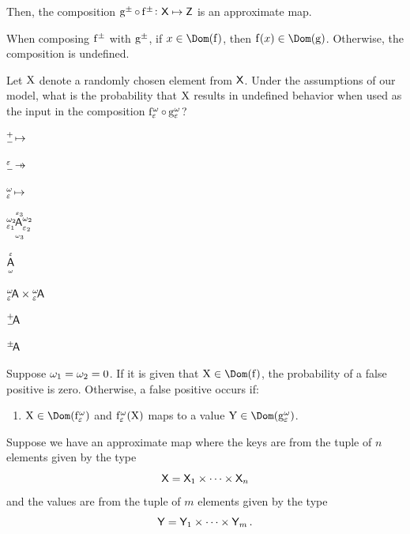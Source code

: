 \documentclass[11pt,final,hidelinks]{article}
\begin{document}
Then, the composition $\APFun{g} \circ \APFun{f} \colon \Set{X} \mapsto \Set{Z}$ is an approximate map.

\begin{assumption}
When composing $\APFun{f}$ with $\APFun{g}$, if $x \in \Dom(\Fun{f})$, then $\Fun{f}(x) \in \Dom\!\left(\Fun{g}\right)$. Otherwise, the composition is undefined.
\end{assumption}
Let $\mathrm{X}$ denote a randomly chosen element from $\Set{X}$. Under the assumptions of our model, what is the probability that $\mathrm{X}$ results in undefined behavior when used as the input in the composition $\APFun{f}[\fprate][\fnrate] \circ \APFun{g}[\fprate][\fnrate]$?


$\ATL{\mapsto}$

$\ATL{\pfun}[\fprate]$

$\ATL{\mapsto}[\fprate][\fnrate]$


$\ATOverUnder{\AT{\ATL{\Set{A}}[\fprate_1][\fnrate_2]}[\fprate_2][\fnrate_2]}[\fprate_3][\fnrate_3]$

$\ATOverUnder{\Set{A}}[\fprate][\fnrate]$


$\ATL{\Set{A}}[\fprate][\fnrate] \times \ATL{\Set{A}}[\fprate][\fnrate]$


$\ATL{\Set{A}}$

${}^{\pm} \! \Set{A}$



Suppose $\omega_1 = \omega_2 = 0$. If it is given that $\RV{X} \in \Dom(\Fun{f})$, the probability of a false positive is zero. Otherwise, a false positive occurs if:
\begin{enumerate}
    \item $\RV{X} \in \Dom(\APFun{f}[\fprate][\fnrate])$ and $\APFun{f}[\fprate][\fnrate](\RV{X})$ maps to a value $\RV{Y} \in \Dom(\APFun{g}[\fprate][\fnrate])$.
\end{enumerate}



Suppose we have an approximate map where the keys are from the tuple of $n$ elements given by the type
\begin{equation}
    \Set{X} = \Set{X}_1 \times \cdots \times \Set{X}_n
\end{equation}
and the values are from the tuple of $m$ elements given by the type
\begin{equation}
    \Set{Y} = \Set{Y}_1 \times \cdots \times \Set{Y}_m\,.
\end{equation}
\end{document}
